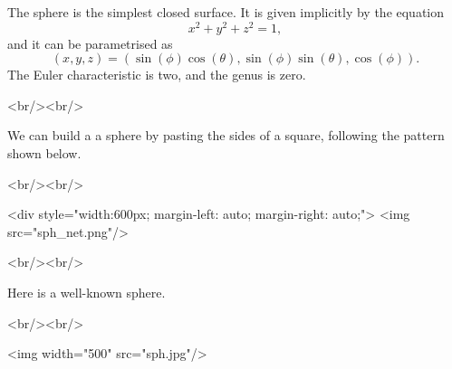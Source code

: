 The sphere is the simplest closed surface.  It is given implicitly by 
the equation 
$$ x^2 + y^2 + z^2 = 1, $$
and it can be parametrised as
$$ (x,y,z) = (\sin(\phi)\cos(\theta),\sin(\phi)\sin(\theta),\cos(\phi)). $$
The Euler characteristic is two, and the genus is zero.

<br/><br/>

We can build a a sphere by pasting the sides of a square,
following the pattern shown below.

<br/><br/>

<div style="width:600px; margin-left: auto; margin-right: auto;">
<img src="sph_net.png"/>

<br/><br/>

Here is a well-known sphere.

<br/><br/>

<img width="500" src="sph.jpg"/>
